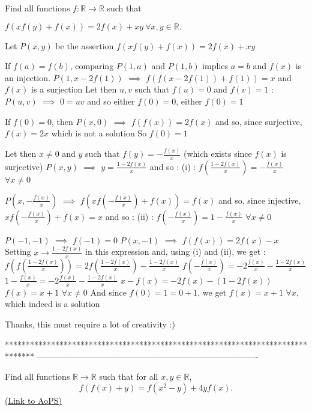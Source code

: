 \begin{solution}
	\begin{tcolorbox}Find all functions $f : \mathbb{R} \to \mathbb{R}$ such that

$f(xf(y) + f(x)) = 2f(x) + xy \ \forall x,y \in \mathbb{R}.$\end{tcolorbox}
Let $P(x,y)$ be the assertion $f(xf(y)+f(x))=2f(x)+xy$

If $f(a)=f(b)$, comparing $P(1,a)$ and $P(1,b)$ implies $a=b$ and $f(x)$ is an injection.
$P(1,x-2f(1))$ $\implies$ $f(f(x-2f(1))+f(1))=x$ and $f(x)$ is a surjection
Let then $u,v$ such that $f(u)=0$ and $f(v)=1$ : $P(u,v)$ $\implies$ $0=uv$ and so either $f(0)=0$, either $f(0)=1$

If $f(0)=0$, then $P(x,0)$ $\implies$ $f(f(x))=2f(x)$ and so, since surjective, $f(x)=2x$ which is not a solution
So $f(0)=1$

Let then $x\ne 0$ and $y$ such that $f(y)=-\frac{f(x)}x$ (which exists since $f(x)$ is surjective)
$P(x,y)$ $\implies$ $y=\frac{1-2f(x)}x$ and so :
(i) : $f(\frac{1-2f(x)}x)=-\frac{f(x)}x$ $\forall x\ne 0$

$P(x,-\frac{f(x)}x)$ $\implies$ $f(xf(-\frac{f(x)}x)+f(x))=f(x)$ and so, since injective, $xf(-\frac{f(x)}x)+f(x)=x$ and so :
(ii) : $f(-\frac{f(x)}x)=1-\frac{f(x)}x$ $\forall x\ne 0$

$P(-1,-1)$ $\implies$ $f(-1)=0$
$P(x,-1)$ $\implies$ $f(f(x))=2f(x)-x$
Setting $x\to \frac{1-2f(x)}x$ in this expression and, using (i) and (ii), we get :
$f(f(\frac{1-2f(x)}x))=2f(\frac{1-2f(x)}x)-\frac{1-2f(x)}x$
$f(-\frac{f(x)}x)=-2\frac{f(x)}x-\frac{1-2f(x)}x$
$1-\frac{f(x)}x=-2\frac{f(x)}x-\frac{1-2f(x)}x$
$x-f(x)=-2f(x)-(1-2f(x))$
$f(x)=x+1$ $\forall x\ne 0$
And since $f(0)=1=0+1$, we get $\boxed{f(x)=x+1}$ $\forall x$, which indeed is a solution
\end{solution}



\begin{solution}
	Thanks, this must require a lot of creativity :)
\end{solution}
*******************************************************************************
-------------------------------------------------------------------------------

\begin{problem}
	Find all functions $\mathbb{R}\to\mathbb{R}$ such that for all $x,y\in\mathbb{R}$,
\[ f(f(x)+y)=f(x^{2}-y)+ 4yf(x).\]
	\flushright \href{https://artofproblemsolving.com/community/c6h415843}{(Link to AoPS)}
\end{problem}



